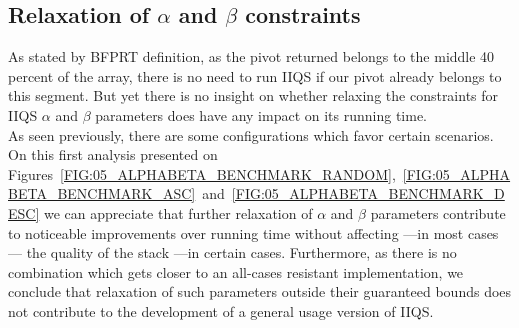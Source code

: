 \subsection{Relaxation of $\alpha$ and $\beta$ constraints}

As stated by BFPRT definition, as the pivot returned belongs to the middle 40 percent of the array, there is no need to run IIQS if our pivot already belongs to this segment. But yet there is no insight on whether relaxing the constraints for IIQS $\alpha$ and $\beta$ parameters does have any impact on its running time.\\

As seen previously, there are some configurations which favor certain scenarios. On this first analysis presented on Figures~\ref{FIG:05_ALPHABETA_BENCHMARK_RANDOM},~\ref{FIG:05_ALPHABETA_BENCHMARK_ASC}~and~\ref{FIG:05_ALPHABETA_BENCHMARK_DESC} we can appreciate that further relaxation of $\alpha$ and $\beta$ parameters contribute to noticeable improvements over running time without affecting ---in most cases--- the quality of the stack ---in certain cases. Furthermore, as there is no combination which gets closer to an all-cases resistant implementation, we conclude that relaxation of such parameters outside their guaranteed bounds does not contribute to the development of a general usage version of IIQS.\\





